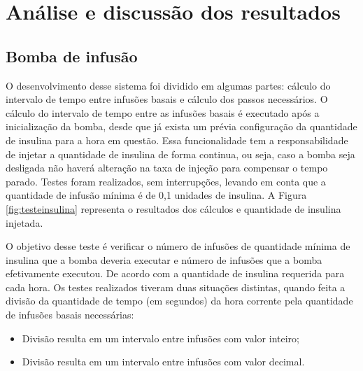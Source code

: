 \chapter{Análise e discussão dos resultados}

\section{Bomba de infusão}
O desenvolvimento desse sistema foi dividido em algumas partes: cálculo do intervalo de tempo entre infusões basais e cálculo dos passos necessários. O cálculo do intervalo de tempo entre as infusões basais é executado após a inicialização da bomba, desde que já exista um prévia configuração da quantidade de insulina para a hora em questão. Essa funcionalidade tem a responsabilidade de injetar a quantidade de insulina de forma continua, ou seja, caso a bomba seja desligada não haverá alteração na taxa de injeção para compensar o tempo parado. Testes foram realizados, sem interrupções, levando em conta que a quantidade de infusão mínima é de 0,1 unidades de insulina. A Figura \ref{fig:testeinsulina} representa o resultados dos cálculos e quantidade de insulina injetada.

O objetivo desse teste é verificar o número de infusões de quantidade mínima de insulina que a bomba deveria executar e número de infusões que a bomba efetivamente executou. De acordo com a quantidade de insulina requerida para cada hora. Os testes realizados tiveram duas situações distintas, quando feita a divisão da quantidade de tempo (em segundos) da hora corrente pela quantidade de infusões basais necessárias:

\begin{itemize}
\item Divisão resulta em um intervalo entre infusões com valor inteiro;
\item Divisão resulta em um intervalo entre infusões com valor decimal.
\end{itemize}

